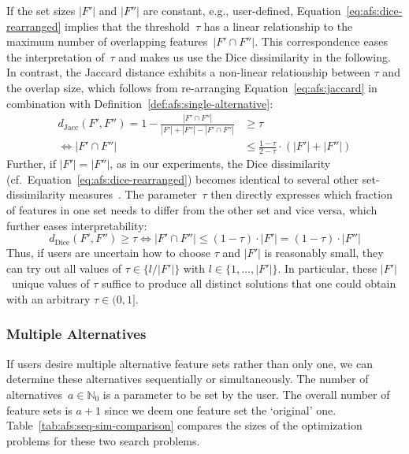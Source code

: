 \documentclass{article}
\theoremstyle{definition}
\begin{document}
If the set sizes $|F'|$ and $|F''|$ are constant, e.g., user-defined, Equation~\ref{eq:afs:dice-rearranged} implies that the threshold~$\tau$ has a linear relationship to the maximum number of overlapping features~$|F' \cap F''|$.
This correspondence eases the interpretation of~$\tau$ and makes us use the Dice dissimilarity in the following.
In contrast, the Jaccard distance exhibits a non-linear relationship between $\tau$ and the overlap size, which follows from re-arranging Equation~\ref{eq:afs:jaccard} in combination with Definition~\ref{def:afs:single-alternative}:
%
\begin{equation}
	\begin{aligned}
		d_{\text{Jacc}}(F',F'') = 1 - \frac{|F' \cap F''|}{|F'| + |F''| - |F' \cap F''|} &\geq \tau \\
		\Leftrightarrow |F' \cap F''| &\leq \frac{1 - \tau}{2 - \tau} \cdot (|F'| + |F''|)
		\end{aligned}
	\label{eq:afs:jaccard-rearranged}
\end{equation}
%
Further, if $|F'| = |F''|$, as in our experiments, the Dice dissimilarity (cf.~Equation~\ref{eq:afs:dice-rearranged}) becomes identical to several other set-dissimilarity measures~\cite{egghe2009new}.
The parameter~$\tau$ then directly expresses which fraction of features in one set needs to differ from the other set and vice versa, which further eases interpretability:
%
\begin{equation}
	d_{\text{Dice}}(F',F'') \geq \tau \Leftrightarrow |F' \cap F''| \leq (1 - \tau) \cdot |F'| = (1 - \tau) \cdot |F''|
	\label{eq:afs:dice-rearranged-equal-size}
\end{equation}
%
Thus, if users are uncertain how to choose $\tau$ and $|F'|$ is reasonably small, they can try out all values of $\tau \in \{l / |F'|\}$ with $l \in \{1, \dots, |F'|\}$.
In particular, these $|F'|$~unique values of $\tau$ suffice to produce all distinct solutions that one could obtain with an arbitrary $\tau \in (0,1]$.

\subsubsection{Multiple Alternatives}
\label{sec:afs:approach:constraints:multiple}

If users desire multiple alternative feature sets rather than only one, we can determine these alternatives sequentially or simultaneously.
The number of alternatives~$a \in \mathbb{N}_0$ is a parameter to be set by the user.
The overall number of feature sets is $a + 1$ since we deem one feature set the `original' one.
Table~\ref{tab:afs:seq-sim-comparison} compares the sizes of the optimization problems for these two search problems.
\end{document}

